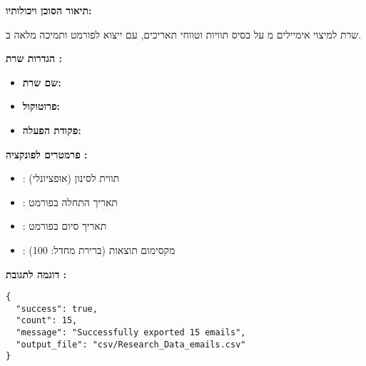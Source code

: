 
\textbf{תיאור הסוכן ויכולותיו:}

שרת  למיצוי אימיילים מ על בסיס תוויות וטווחי תאריכים, עם ייצוא לפורמט  ותמיכה מלאה ב.

\textbf{הגדרות שרת :}
\begin{itemize}
\item \textbf{שם שרת:} 
\item \textbf{פרוטוקול:} 
\item \textbf{פקודת הפעלה:} 
\end{itemize}

\textbf{פרמטרים לפונקציה :}
\begin{itemize}
\item {}: תווית  לסינון (אופציונלי)
\item {}: תאריך התחלה בפורמט 
\item {}: תאריך סיום בפורמט 
\item {}: מקסימום תוצאות (ברירת מחדל: \num{100})
\end{itemize}

\textbf{דוגמה לתגובת :}

\begin{english}
\begin{verbatim}
{
  "success": true,
  "count": 15,
  "message": "Successfully exported 15 emails",
  "output_file": "csv/Research_Data_emails.csv"
}
\end{verbatim}
\end{english}
